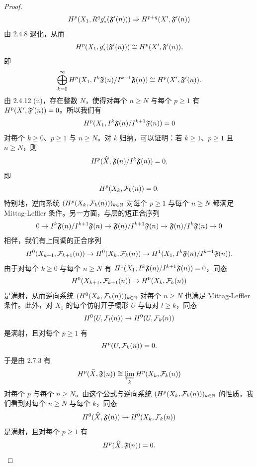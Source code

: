 \begin{proof}
\begin{equation*}
H^p(X_1,R^qg'_*(\mathfrak{F}'(n)))\Rightarrow H^{p+q}(X',\mathfrak{F}'(n))
\end{equation*}
由 2.4.8 退化，从而
\begin{equation*}
H^p(X_1,g'_*(\mathfrak{F}'(n)))\cong H^p(X',\mathfrak{F}'(n)),
\end{equation*}
即
\begin{equation*}
\bigoplus_{k=0}^{\infty}H^p(X_1,I^k\mathfrak{F}(n)/I^{k+1}\mathfrak{F}(n))\cong H^p(X',\mathfrak{F}'(n)).
\end{equation*}
由 2.4.12 (ii)，存在整数 $N$，使得对每个 $n\ge N$ 与每个 $p\ge1$ 有 $H^p(X',\mathfrak{F}'(n))=0$。所以我们有
\begin{equation*}
H^p(X_1,I^k\mathfrak{F}(n)/I^{k+1}\mathfrak{F}(n))=0
\end{equation*}
对每个 $k\ge0$、$p\ge1$ 与 $n\ge N$。对 $k$ 归纳，可以证明：若 $k\ge1$、$p\ge1$ 且 $n\ge N$，则
\begin{equation*}
H^p(\widehat{X},\mathfrak{F}(n)/I^k\mathfrak{F}(n))=0,
\end{equation*}
即
\begin{equation*}
H^p(X_k,\mathcal{F}_k(n))=0.
\end{equation*}
特别地，逆向系统 $(H^p(X_k,\mathcal{F}_k(n)))_{k\in\mathbb{N}}$ 对每个 $p\ge1$ 与每个 $n\ge N$ 都满足 Mittag-Leffler 条件。另一方面，与层的短正合序列
\begin{equation*}
0\to I^k\mathfrak{F}(n)/I^{k+1}\mathfrak{F}(n)\to\mathfrak{F}(n)/I^{k+1}\mathfrak{F}(n)\to\mathfrak{F}(n)/I^k\mathfrak{F}(n)\to 0
\end{equation*}
相伴，我们有上同调的正合序列
\begin{equation*}
H^0(X_{k+1},\mathcal{F}_{k+1}(n))\to H^0(X_k,\mathcal{F}_k(n))\to H^1(X_1,I^k\mathfrak{F}(n)/I^{k+1}\mathfrak{F}(n)).
\end{equation*}
由于对每个 $k\ge0$ 与每个 $n\ge N$ 有 $H^1(X_1,I^k\mathfrak{F}(n)/I^{k+1}\mathfrak{F}(n))=0$，同态
\begin{equation*}
H^0(X_{k+1},\mathcal{F}_{k+1}(n))\to H^0(X_k,\mathcal{F}_k(n))
\end{equation*}
是满射，从而逆向系统 $(H^0(X_k,\mathcal{F}_k(n)))_{k\in\mathbb{N}}$ 对每个 $n\ge N$ 也满足 Mittag-Leffler 条件。此外，对 $X_1$ 的每个仿射开子概形 $U$ 与每对 $l\ge k$，同态
\begin{equation*}
H^0(U,\mathcal{F}_l(n))\to H^0(U,\mathcal{F}_k(n))
\end{equation*}
是满射，且对每个 $p\ge1$ 有
\begin{equation*}
H^p(U,\mathcal{F}_k(n))=0.
\end{equation*}
于是由 2.7.3 有
\begin{equation*}
H^p(\widehat{X},\mathfrak{F}(n))\cong\varprojlim_k H^p(X_k,\mathcal{F}_k(n))
\end{equation*}
对每个 $p$ 与每个 $n\ge N$。由这个公式与逆向系统 $(H^p(X_k,\mathcal{F}_k(n)))_{k\in\mathbb{N}}$ 的性质，我们看到对每个 $n\ge N$ 与每个 $k$，同态
\begin{equation*}
H^0(\widehat{X},\mathfrak{F}(n))\to H^0(X_k,\mathcal{F}_k(n))
\end{equation*}
是满射，且对每个 $p\ge1$ 有
\begin{equation*}
H^p(\widehat{X},\mathfrak{F}(n))=0.
\end{equation*}
\end{proof}

